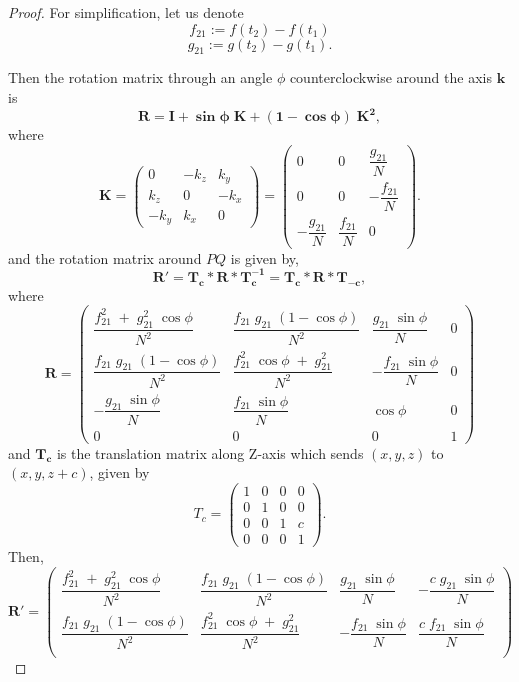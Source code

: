 \documentclass[10pt,a4paper,reqno]{amsart}
\theoremstyle{definition}
\theoremstyle{remark}
\begin{document}
\begin{proof}
	For simplification, let us denote 
	\[f_{21}:=f(t_{2})-f(t_{1})\] 
	\[g_{21}:=g(t_{2})-g(t_{1}).\]
	
	Then the rotation matrix through an angle $\phi$ counterclockwise around the axis $\mathbf{k}$ is
	\[\mathbf{R=I+\sin\phi \; K+(1-\cos\phi)\;K^{2}},\]
	where
	\[ \mathbf{K}=
	\begin{pmatrix}
		0 & -k_{z} & k_{y} \\
		k_{z} &0 & -k_{x} \\
		-k_{y} & k_{x} & 0
	\end{pmatrix}
	=\begin{pmatrix}
		0 & 0 &\dfrac{g_{21}}{N} \\[0.5cm]
		0 & 0 & -\dfrac{f_{21}}{N} \\[0.5cm]
		-\dfrac{g_{21}}{N} & \dfrac{f_{21}}{N} & 0
	\end{pmatrix}.\]
	and the rotation matrix around $PQ$ is given by,
	\[\mathbf{R}'=\mathbf{T_{c}*R*T_{c}^{-1}}=\mathbf{T_{c}*R*T_{-c}},\]
	where
	\[\mathbf{R}=
	\begin{pmatrix}
		\dfrac{f_{21}^{2}\;+\;g_{21}^{2}\;\cos\phi}{N^{2}} & \dfrac{f_{21}\;g_{21}\;(1-\cos\phi)}{N^{2}} & \dfrac{g_{21}\;\sin\phi}{N} & 0\\[0.5cm]
		\dfrac{f_{21}\;g_{21}\;(1-\cos\phi)}{N^{2}} &   \dfrac{f_{21}^{2}\;\cos\phi\;+\;g_{21}^{2}}{N^{2}}  & -\dfrac{f_{21}\;\sin\phi}{N}& 0\\[0.5cm]
		-\dfrac{g_{21}\;\sin\phi}{N} & \dfrac{f_{21}\;\sin\phi}{N}&\cos\phi & 0 \\[0.5cm]
		0 & 0 & 0 & 1
	\end{pmatrix}\]
	and $\mathbf{T_{c}}$ is the translation matrix along Z-axis which sends $(x,y,z)$ to $(x,y,z+c)$, given by \[T_{c}=
	\begin{pmatrix}
		1 & 0 & 0 & 0 \\
		0& 1 & 0 & 0\\
		0 & 0 & 1 & c \\
		0 & 0 & 0 & 1
	\end{pmatrix}.\]
	Then,
	\[\mathbf{R}'=
	\begin{pmatrix}
		\dfrac{f_{21}^{2}\;+\;g_{21}^{2}\;\cos\phi}{N^{2}} & \dfrac{f_{21}\;g_{21}\;(1-\cos\phi)}{N^{2}} & \dfrac{g_{21}\;\sin\phi}{N} & -\dfrac{c\;g_{21}\;\sin\phi}{N}\\[0.5cm]
		\dfrac{f_{21}\;g_{21}\;(1-\cos\phi)}{N^{2}} &   \dfrac{f_{21}^{2}\;\cos\phi\;+\;g_{21}^{2}}{N^{2}}  & -\dfrac{f_{21}\;\sin\phi}{N} & \dfrac{c\;f_{21}\;\sin\phi}{N}\\[0.5cm]

\end{pmatrix}\]
\end{proof}
\end{document}
